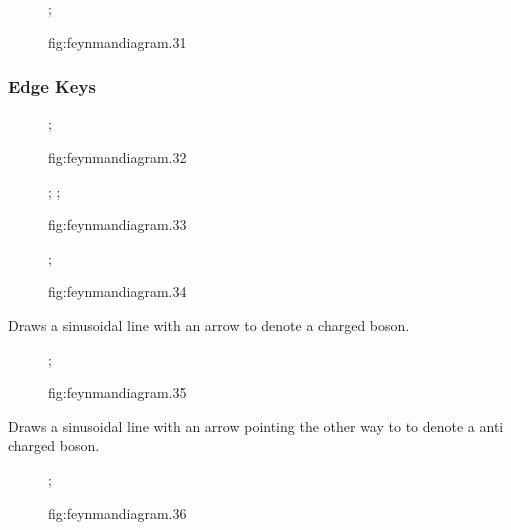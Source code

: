 \documentclass[UTF8]{article}
\begin{document}
\begin{figure}[hp]
    \centering
    ;
    \caption{fig:feynmandiagram.31}
    \label{fig:feynmandiagram.31}
\end{figure}


\subsubsection{Edge Keys}


\begin{figure}[hp]
    \centering
    ;
    \caption{fig:feynmandiagram.32}
    \label{fig:feynmandiagram.32}
\end{figure}


\begin{figure}[hp]
    \centering
    ;
    ;
    \caption{fig:feynmandiagram.33}
    \label{fig:feynmandiagram.33}
\end{figure}



\begin{figure}[hp]
    \centering
    ;
    \caption{fig:feynmandiagram.34}
    \label{fig:feynmandiagram.34}
\end{figure}

Draws a sinusoidal line with an arrow to denote a charged boson.

\begin{figure}[hp]
    \centering
    ;
    \caption{fig:feynmandiagram.35}
    \label{fig:feynmandiagram.35}
\end{figure}


Draws a sinusoidal line with an arrow pointing the other way to to denote a anti charged boson.

\begin{figure}[hp]
    \centering
    ;
    \caption{fig:feynmandiagram.36}
    \label{fig:feynmandiagram.36}
\end{figure}
\end{document}
